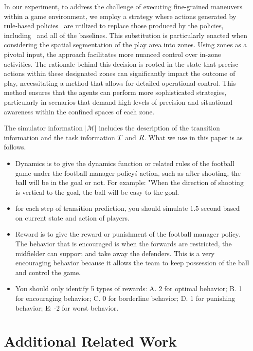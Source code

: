 In our experiment, to address the challenge of executing fine-grained maneuvers within a game environment, we employ a strategy where actions generated by rule-based policies~\citep{anvarov2020football} are utilized to replace those produced by the policies, including \algo~and all of the baselines. This substitution is particularly enacted when considering the spatial segmentation of the play area into zones. Using zones as a pivotal input, the approach facilitates more nuanced control over in-zone activities. The rationale behind this decision is rooted in the state that precise actions within these designated zones can significantly impact the outcome of play, necessitating a method that allows for detailed operational control. This method ensures that the agents can perform more sophisticated strategies, particularly in scenarios that demand high levels of precision and situational awareness within the confined spaces of each zone. 

The simulator information $|\mathcal{M}|$ includes the description of the transition information and the task information $T$ and $R$. What we use in this paper is as follows.
\begin{itemize}
    \item Dynamics is to give the dynamics function or related rules of the football game under the football manager policy\'s action, such as after shooting, the ball will be in the goal or not. For example: "When the direction of shooting is vertical to the goal, the ball will be easy to the goal.
    \item for each step of transition prediction, you should simulate 1.5 second based on current state and action of players.
    \item Reward is to give the reward or punishment of the football manager policy. The behavior that is encouraged is when the forwards are restricted, the midfielder can support and take away the defenders.  This is a very encouraging behavior because it allows the team to keep possession of the ball and control the game. 
    \item You should only identify 5 types of rewards:  A. 2 for optimal behavior;  B. 1 for encouraging behavior;  C. 0 for borderline behavior; D. 1 for punishing behavior;  E: -2 for worst behavior.
\end{itemize}


\section{Additional Related Work}

